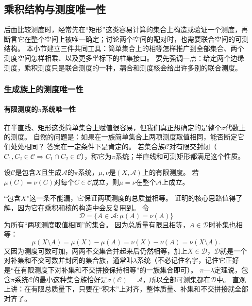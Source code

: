 \subsection{乘积结构与测度唯一性}

后面比较测度时，经常先在“矩形”这类容易计算的集合上构造或验证一个测度，再断言它在整个空间上被唯一确定；讨论两个空间的配对时，也需要联合空间的可测结构。
本小节建立三件共同工具：简单集合上的相等怎样推广到全部集合、两个测度空间怎样相乘、以及更多坐标下的柱集接口。
要先强调一点：给定两个边缘测度，乘积测度只是联合测度的一种，耦合和测度核会给出许多别的联合测度。

\subsubsection{生成族上的测度唯一性}

\paragraph{有限测度的$\pi$系统唯一性}

在半直线、矩形这类简单集合上赋值很容易，但我们真正想确定的是整个$\sigma$代数上的测度。
自然的问题是：如果在一族简单集合上两项测度取值相同，能否断定它们处处相同？
答案在一定条件下是肯定的。
若集合族$\mathcal C$对有限交封闭（$C_1,C_2\in\mathcal C\Rightarrow C_1\cap C_2\in\mathcal C$），称它为$\pi$系统；半直线和可测矩形都满足这个性质。

\begin{theorem}[$\pi$系统上的测度唯一性]
\label{thm:measure-pi-lambda-uniqueness}
设$\mathcal C$是包含$X$且生成$\mathcal A$的$\pi$系统，$\mu,\nu$是$(X,\mathcal A)$上的有限测度。
若$\mu(C)=\nu(C)$对每个$C\in\mathcal C$成立，则$\mu=\nu$在整个$\mathcal A$上成立。
\end{theorem}

“包含$X$”这一条不能漏，它保证两项测度的总质量相等。
证明的核心思路值得了解，因为它在乘积和核的构造中会反复用到。
令
\[
 \mathcal D=\{A\in\mathcal A:\mu(A)=\nu(A)\}
\]
为所有“两项测度取值相同”的集合。
因为总质量有限且相等，$A\in\mathcal D$时补集也相等：
\[
 \mu(X\setminus A)=\mu(X)-\mu(A)=\nu(X)-\nu(A)=\nu(X\setminus A).
\]
又因为测度可数可加，两两不交集合并起来后仍然相等，加上$X\in\mathcal D$，$\mathcal D$就是一个对补集和不交可数并封闭的集合族，通常叫$\lambda$系统（不必记住名字，记住它正好是“在有限测度下对补集和不交拼接保持相等”的一族集合即可）。
$\pi$—$\lambda$定理说，包含$\pi$系统$\mathcal C$的最小这种集合族恰好是$\sigma(\mathcal C)=\mathcal A$，所以全部可测集都在$\mathcal D$中。
直观上讲：在有限总质量下，只要在“积木”上对齐，整体质量、补集和不交拼接就全部对齐了。

